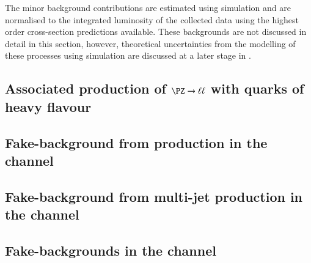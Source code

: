 The minor background contributions are estimated using simulation and
are normalised to the integrated luminosity of the collected data
using the highest order cross-section predictions available. These
backgrounds are not discussed in detail in this section, however,
theoretical uncertainties from the modelling of these processes using
simulation are discussed at a later stage in
.




\subsection{Associated production of $\PZ \to \ell\ell$ with quarks of heavy flavour}
\label{sec:bkg_zjets}


\subsection{Fake-\tauhadvis background from \ttbar production in the \hadhad channel}
\label{sec:bkg_hadhad_ttbarfakes}


\subsection{Fake-\tauhadvis background from multi-jet production in the \hadhad channel}
\label{sec:bkg_hadhad_ff}


\subsection{Fake-\tauhadvis backgrounds in the \lephad channel}
\label{sec:bkg_lephad_combined_ff}



